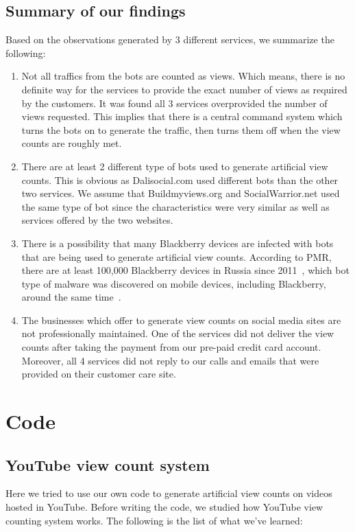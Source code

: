 \documentclass[conference]{IEEEtran}
\begin{document}
\subsection{Summary of our findings}

Based on the observations generated by 3 different services, we summarize the following:

\begin{enumerate}
  \item Not all traffics from the bots are counted as views. Which means, there is no definite way for the services to provide the exact number of views as required by the customers. It was found all 3 services overprovided the number of views requested. This implies that there is a central command system which turns the bots on to generate the traffic, then turns them off when the view counts are roughly met.
  \item There are at least 2 different type of bots used to generate artificial view counts. This is obvious as Dalisocial.com used different bots than the other two services. We assume that Buildmyviews.org and SocialWarrior.net used the same type of bot since the characteristics were very similar as well as services offered by the two websites.
  \item There is a possibility that many Blackberry devices are infected with bots that are being used to generate artificial view counts. According to PMR, there are at least 100,000 Blackberry devices in Russia since 2011~\cite{c13}, which bot type of malware was discovered on mobile devices, including Blackberry, around the same time~\cite{c12}.
  \item The businesses which offer to generate view counts on social media sites are not professionally maintained. One of the services did not deliver the view counts after taking the payment from our pre-paid credit card account. Moreover, all 4 services did not reply to our calls and emails that were provided on their customer care site.
\end{enumerate}

\section{Code}

\subsection{YouTube view count system}

Here we tried to use our own code to generate artificial view counts on videos hosted in YouTube. Before writing the code, we studied how YouTube view counting system works. The following is the list of what we've learned:
\end{document}
